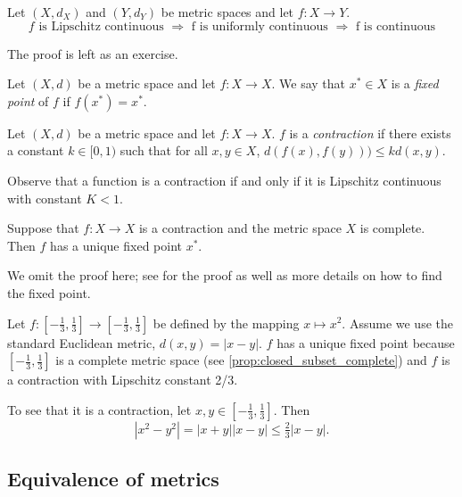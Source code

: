 \documentclass{article}
\begin{document}
\begin{proposition}
Let $(X,d_X)$ and $(Y,d_Y)$ be metric spaces and let $f:X\to Y$. 
$$f \text{ is Lipschitz continuous } \Rightarrow \text{ f is uniformly continuous } \Rightarrow \text{ f is continuous}$$
\end{proposition}

The proof is left as an exercise. 

\begin{definition}
Let $(X,d)$ be a metric space and let $f:X \to X$. We say that $x^* \in X$ is a \emph{fixed point} of $f$ if $f(x^*) = x^*$.
\end{definition}

\begin{definition}
Let $(X,d)$ be a metric space and let $f:X \to X$. $f$ is a \emph{contraction} if there exists a constant $k \in [0,1)$ such that for all $x,y \in X$, $d(f(x),f(y))) \leq k d(x,y)$.
\end{definition}

Observe that a function is a contraction if and only if it is Lipschitz continuous with constant $K < 1$.

\begin{theorem}
Suppose that $f : X \to X$ is a contraction and the metric space $X$ is complete. Then $f$ has a unique fixed point $x^*$.
\end{theorem}

We omit the proof here; see \cite[p.240]{realanalysis} for the proof as well as more details on how to find the fixed point.

\begin{example}
Let $f:\left[-\frac{1}{3},\frac{1}{3}\right] \to \left[-\frac{1}{3},\frac{1}{3}\right]$ be defined by the mapping $x \mapsto x^2$. Assume we use the standard Euclidean metric, $d(x,y) = |x-y|$. $f$ has a unique fixed point because $\left[-\frac{1}{3},\frac{1}{3}\right]$ is a complete metric space (see \cref{prop:closed_subset_complete}) and $f$ is a contraction with Lipschitz constant 2/3.

To see that it is a contraction, let $x,y \in \left[-\frac{1}{3},\frac{1}{3}\right]$. Then
\begin{equation*}
   |x^2 - y^2| = |x+y| |x-y| \leq \tfrac{2}{3} |x-y|. 
\end{equation*}
\end{example}


\subsection{Equivalence of metrics}
\end{document}
